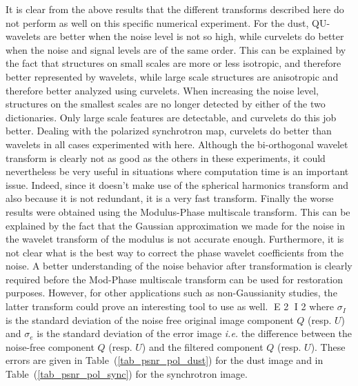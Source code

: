 It is clear from the above results that the different transforms described here do not perform as well on this specific numerical experiment. For the dust, QU-wavelets are better when the noise level is not so high, while curvelets do better when the noise and signal levels are of the same order. This can be explained by the fact that structures on small scales are more or less isotropic, and therefore 
better represented by wavelets, while large scale structures are anisotropic and therefore better analyzed using curvelets. When increasing the noise level, structures on the smallest scales are no longer detected by either of the two dictionaries. Only large scale features are detectable, and curvelets do this job better. Dealing with the polarized synchrotron map, curvelets  do better than wavelets in all cases experimented with here. Although the bi-orthogonal wavelet transform is clearly not as good as the others in these experiments, it could nevertheless be very useful in situations where computation time is an important issue. Indeed, since it doesn't make use of the spherical harmonics transform and also because it is not redundant, it is a very fast transform.
Finally the worse results were obtained using the Modulus-Phase multiscale transform. This can be explained by the fact that the Gaussian approximation we made for the noise in the wavelet transform of the modulus  is not accurate enough. Furthermore, it is not clear what is the best way to correct the phase wavelet coefficients from the noise. A better understanding of the noise behavior after transformation is clearly required before the Mod-Phase multiscale transform can be used for restoration purposes. However, for other applications such as non-Gaussianity studies, the latter transform could prove an interesting tool to use as well.
E 2
I 2
where $\sigma_I$ is the standard deviation  of the noise free original image component $Q$ (resp. $U$) and 
$\sigma_e$ is the standard deviation of the error image \textit{i.e.} the difference between the noise-free component $Q$ 
(resp. $U$) and the filtered component $Q$ (resp. $U$). These errors are given in Table~(\ref{tab_psnr_pol_dust}) 
for the dust image and in Table~(\ref{tab_psnr_pol_sync}) for the synchrotron image.\\


